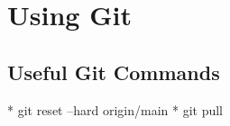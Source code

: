 \section{Using Git}
\label{sec:git}

\subsection{Useful Git Commands}
\label{sec:useful-git}

* git reset --hard origin/main
* git pull